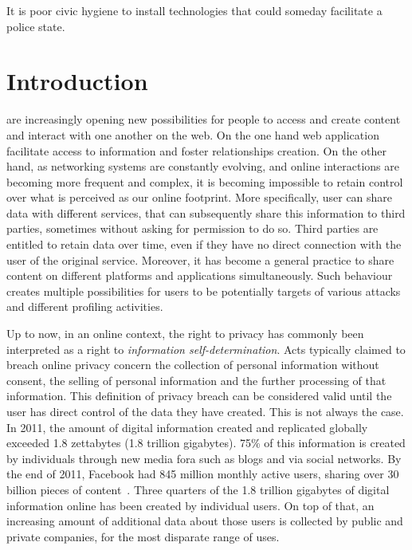 \begin{savequote}[75mm] 
It is poor civic hygiene to install technologies that could someday facilitate a police state.
\end{savequote}

\chapter{Introduction}

 are increasingly opening new possibilities for people to access and create content and interact with one another on the web. On the one hand web application facilitate access to information and foster relationships creation. On the other hand, as networking systems are constantly evolving, and online interactions are becoming more frequent and complex, it is becoming impossible to retain control over what is perceived as our online footprint. More specifically, user can share data with different services, that can subsequently share this information to third parties, sometimes without asking for permission to do so. Third parties are entitled to retain data over time, even if they have no direct connection with the user of the original service. Moreover, it has become a general practice to share content on different platforms and applications simultaneously. Such behaviour creates multiple possibilities for users to be potentially targets of various attacks and different profiling activities.

Up to now, in an online context, the right to privacy has commonly been interpreted as a right to \emph{information self-determination}. Acts typically claimed to breach online privacy concern the collection of personal information without consent, the selling of personal information and the further processing of that information. This definition of privacy breach can be considered valid until the user has direct control of the data they have created. This is not always the case. In 2011, the amount of digital information created and replicated globally exceeded 1.8 zettabytes (1.8 trillion gigabytes). 75\% of this information is created by individuals through new media fora such as blogs and via social networks. By the end of 2011, Facebook had 845 million monthly active users, sharing over 30 billion pieces of content~\cite{library-briefing}. Three quarters of the 1.8 trillion gigabytes of digital information online has been created by individual users. On top of that, an increasing amount of additional data about those users is collected by public and private companies, for the most disparate range of uses.

